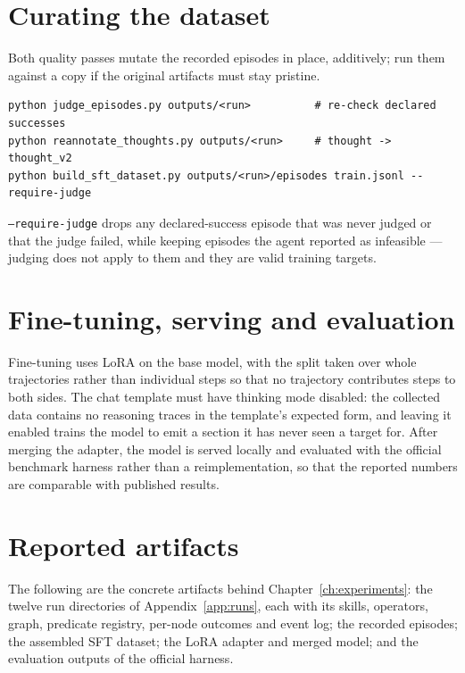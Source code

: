 \section{Curating the dataset}
\label{app:repro-curate}

Both quality passes mutate the recorded episodes in place, additively; run them
against a copy if the original artifacts must stay pristine.

\begin{lstlisting}[style=mystyle,numbers=none,basicstyle=\scriptsize\ttfamily]
python judge_episodes.py outputs/<run>          # re-check declared successes
python reannotate_thoughts.py outputs/<run>     # thought -> thought_v2
python build_sft_dataset.py outputs/<run>/episodes train.jsonl --require-judge
\end{lstlisting}

\noindent
\texttt{--require-judge} drops any declared-success episode that was never
judged or that the judge failed, while keeping episodes the agent reported as
infeasible --- judging does not apply to them and they are valid training
targets.

\section{Fine-tuning, serving and evaluation}
\label{app:repro-train}

Fine-tuning uses LoRA on the base model, with the split taken over whole
trajectories rather than individual steps so that no trajectory contributes
steps to both sides. The chat template must have thinking mode disabled: the
collected data contains no reasoning traces in the template's expected form,
and leaving it enabled trains the model to emit a section it has never seen a
target for. After merging the adapter, the model is served locally and
evaluated with the official benchmark harness rather than a reimplementation,
so that the reported numbers are comparable with published results.

\section{Reported artifacts}
\label{app:repro-artifacts}

The following are the concrete artifacts behind Chapter~\ref{ch:experiments}:
the twelve run directories of Appendix~\ref{app:runs}, each with its skills,
operators, graph, predicate registry, per-node outcomes and event log; the
recorded episodes; the assembled SFT dataset; the LoRA adapter and merged
model; and the evaluation outputs of the official harness.
